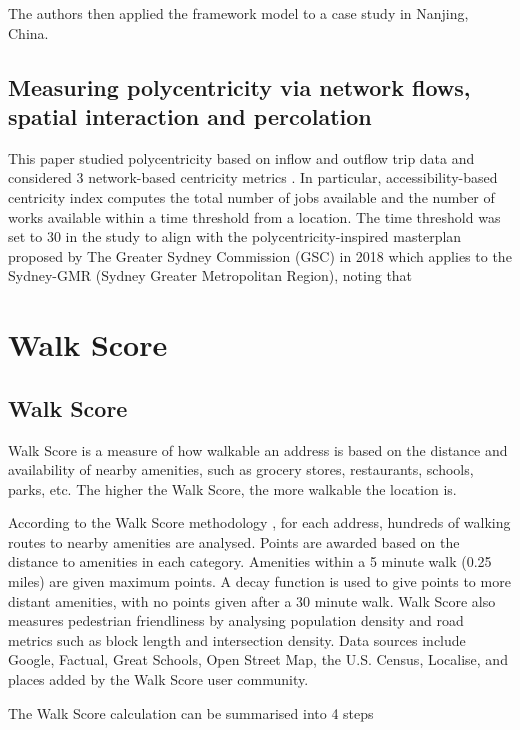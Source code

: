 The authors then applied the framework model to a case study in Nanjing, China.

\subsection{Measuring polycentricity via network flows, spatial interaction and percolation}

This paper studied polycentricity based on inflow and outflow trip data and considered 3 network-based centricity metrics \cite{sarkar_measuring_2020}. In particular, accessibility-based centricity index computes the total number of jobs available and the number of works available within a time threshold from a location. The time threshold was set to 30 in the study to align with the polycentricity-inspired masterplan proposed by The Greater Sydney Commission (GSC) in 2018 which applies to the Sydney-GMR (Sydney Greater Metropolitan Region), noting that 

\section{Walk Score}

\subsection{Walk Score}

Walk Score is a measure of how walkable an address is based on the distance and availability of nearby amenities, such as grocery stores, restaurants, schools, parks, etc. The higher the Walk Score, the more walkable the location is.

According to the Walk Score methodology \cite{walkscore}, for each address, hundreds of walking routes to nearby amenities are analysed. Points are awarded based on the distance to amenities in each category. Amenities within a 5 minute walk (0.25 miles) are given maximum points. A decay function is used to give points to more distant amenities, with no points given after a 30 minute walk. Walk Score also measures pedestrian friendliness by analysing population density and road metrics such as block length and intersection density. Data sources include Google, Factual, Great Schools, Open Street Map, the U.S. Census, Localise, and places added by the Walk Score user community.

The Walk Score calculation can be summarised into 4 steps

